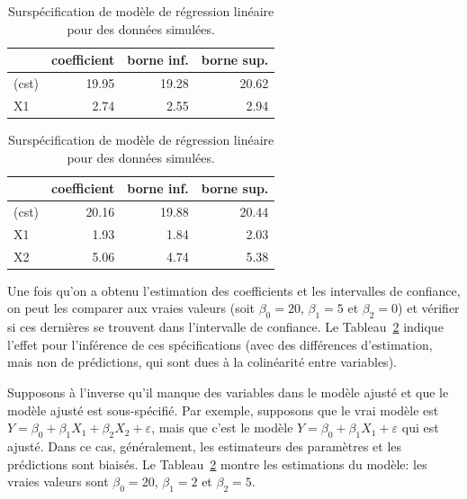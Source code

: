\documentclass[
  11pt,
  letterpaper,
]{scrbook}
\theoremstyle{definition}
\theoremstyle{remark}
\begin{document}
\begin{table}

\caption{\label{tbl-specification}Surspécification de modèle de
régression linéaire pour des données
simulées.}\begin{minipage}[t]{\linewidth}

{\centering 

\centering
\begin{tabular}[t]{lrrr}
\toprule
  & coefficient & borne inf. & borne sup.\\
\midrule
(cst) & 19.95 & 19.28 & 20.62\\
X1 & 2.74 & 2.55 & 2.94\\
\bottomrule
\end{tabular}

}

\end{minipage}%
\newline
\begin{minipage}[t]{\linewidth}

{\centering 

\centering
\begin{tabular}[t]{lrrr}
\toprule
  & coefficient & borne inf. & borne sup.\\
\midrule
(cst) & 20.16 & 19.88 & 20.44\\
X1 & 1.93 & 1.84 & 2.03\\
X2 & 5.06 & 4.74 & 5.38\\
\bottomrule
\end{tabular}

}

\end{minipage}%

\end{table}

Une fois qu'on a obtenu l'estimation des coefficients et les intervalles
de confiance, on peut les comparer aux vraies valeurs (soit
\(\beta_0 = 20\), \(\beta_1=5\) et \(\beta_2 = 0\)) et vérifier si ces
dernières se trouvent dans l'intervalle de confiance. Le
Tableau~\ref{tbl-specification} indique l'effet pour l'inférence de ces
spécifications (avec des différences d'estimation, mais non de
prédictions, qui sont dues à la colinéarité entre variables).

Supposons à l'inverse qu'il manque des variables dans le modèle ajusté
et que le modèle ajusté est sous-spécifié. Par exemple, supposons que le
vrai modèle est \(Y=\beta_0+\beta_1X_1+\beta_2X_2+\varepsilon\), mais
que c'est le modèle \(Y=\beta_0+\beta_1X_1+\varepsilon\) qui est ajusté.
Dans ce cas, généralement, les estimateurs des paramètres et les
prédictions sont biaisés. Le Tableau~\ref{tbl-specification} montre les
estimations du modèle: les vraies valeurs sont \(\beta_0=20\),
\(\beta_1 = 2\) et \(\beta_2 = 5\).
\end{document}

